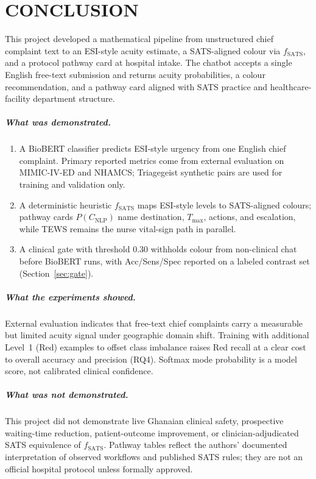 \chapter{CONCLUSION}
\label{ch:conclusion}

This project developed a mathematical pipeline from unstructured chief complaint text to an ESI-style acuity estimate, a SATS-aligned colour via \(f_{\mathrm{SATS}}\), and a protocol pathway card at hospital intake. The chatbot accepts a single English free-text submission and returns acuity probabilities, a colour recommendation, and a pathway card aligned with SATS practice and healthcare-facility department structure.

\paragraph{What was demonstrated.}
\begin{enumerate}
\item A BioBERT classifier predicts ESI-style urgency from one English chief complaint. Primary reported metrics come from external evaluation on MIMIC-IV-ED and NHAMCS; Triagegeist synthetic pairs are used for training and validation only.
\item A deterministic heuristic \(f_{\mathrm{SATS}}\) maps ESI-style levels to SATS-aligned colours; pathway cards \(P(C_{\mathrm{NLP}})\) name destination, \(T_{\max}\), actions, and escalation, while TEWS remains the nurse vital-sign path in parallel.
\item A clinical gate with threshold \(0.30\) withholds colour from non-clinical chat before BioBERT runs, with Acc/Sens/Spec reported on a labeled contrast set (Section~\ref{sec:gate}).
\end{enumerate}

\paragraph{What the experiments showed.}
External evaluation indicates that free-text chief complaints carry a measurable but limited acuity signal under geographic domain shift. Training with additional Level~1 (Red) examples to offset class imbalance raises Red recall at a clear cost to overall accuracy and precision (RQ4). Softmax mode probability is a model score, not calibrated clinical confidence.

\paragraph{What was not demonstrated.}
This project did not demonstrate live Ghanaian clinical safety, prospective waiting-time reduction, patient-outcome improvement, or clinician-adjudicated SATS equivalence of \(f_{\mathrm{SATS}}\). Pathway tables reflect the authors' documented interpretation of observed workflows and published SATS rules; they are not an official hospital protocol unless formally approved.

